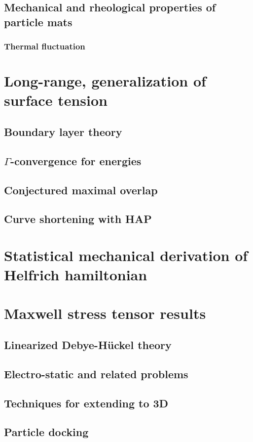 \documentclass[preprint,11pt]{article}
\begin{document}
\subsection{Mechanical and rheological properties of particle mats}
\subsubsection{Thermal fluctuation}

\section{Long-range, generalization of surface tension}
\subsection{Boundary layer theory}
\subsection{$\Gamma$-convergence for energies}
\subsection{Conjectured maximal overlap}
\subsection{Curve shortening with HAP}

\section{Statistical mechanical derivation of Helfrich hamiltonian} 

\section{Maxwell stress tensor results}
\subsection{Linearized Debye-H\"uckel theory}
\subsection{Electro-static and related problems}
\subsection{Techniques for extending to 3D}
\subsection{Particle docking}
\end{document}
